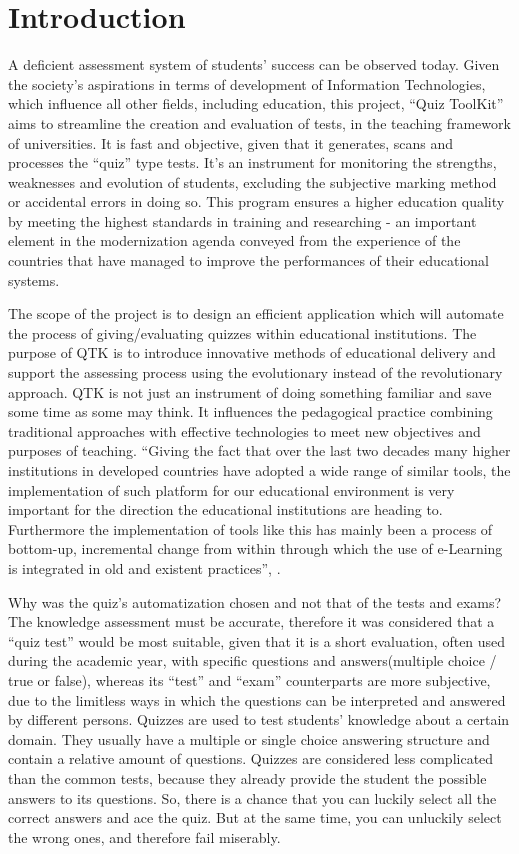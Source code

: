 \section*{Introduction}


A deficient assessment system of students’ success can be observed today. Given the society’s  aspirations in terms of development of Information Technologies, which influence all other fields, including education, this project, “Quiz ToolKit” aims to streamline the creation and evaluation of tests, in the teaching framework of universities. It is fast and objective, given that it generates, scans and processes the “quiz” type tests. It’s an instrument for monitoring the strengths, weaknesses and evolution of students, excluding the subjective marking method or accidental errors in doing so. This program ensures a higher education quality by meeting the highest standards in training and researching - an important element in the modernization agenda conveyed from the experience of the countries that have managed to improve the performances of their educational systems.

The scope of the project is to design an efficient application which will automate the process of giving/evaluating quizzes within educational institutions. The purpose of QTK is to introduce innovative methods of educational delivery and support the assessing process using the evolutionary instead of the revolutionary approach. QTK is not just an instrument of doing something familiar and save some time as some may think. It influences the pedagogical practice combining traditional approaches with effective technologies to meet new objectives and purposes of teaching. ``Giving the fact that over the last two decades many higher institutions in developed countries have adopted a wide range of similar tools, the implementation of such platform for our educational environment is very important for the direction the educational institutions are heading to. Furthermore the implementation of tools like this has mainly been a process of bottom-up, incremental change from within through which the use of e-Learning is integrated in old and existent practices'', \cite{introduction_collins}.

Why was the quiz’s automatization chosen and not that of the tests and exams? The knowledge assessment must be accurate, therefore it was considered that a “quiz test” would be most suitable, given that it is a short evaluation, often used during the academic year, with specific questions and answers(multiple choice / true or false), whereas its “test” and “exam” counterparts are more subjective, due to the limitless ways in which the questions can be interpreted and answered by different persons.
Quizzes are used to test students’ knowledge about a certain domain. They usually have a multiple or single choice answering structure and contain a relative amount of questions. Quizzes are considered less complicated than the common tests, because they already provide the student the possible answers to its questions. So, there is a chance that you can luckily select all the correct answers and ace the quiz. But at the same time, you can unluckily select the wrong ones, and therefore fail miserably.

